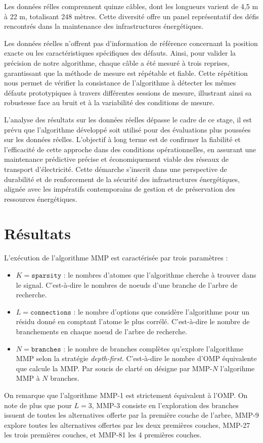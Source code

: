 \documentclass[9pt,a4paper,twoside]{rho}
\begin{document}
Les données rélles comprennent quinze câbles, dont les longueurs varient de 4,5 m à 22 m, totalisant 248 mètres. Cette diversité offre un panel représentatif des défis rencontrés dans la maintenance des infrastructures énergétiques.

Les données réelles n'offrent pas d'information de référence concernant la position exacte ou les caractéristiques spécifiques des défauts. Ainsi, pour valider la précision de notre algorithme, chaque câble a été mesuré à trois reprises, garantissant que la méthode de mesure est répétable et fiable. Cette répétition nous permet de vérifier la consistance de l'algorithme à détecter les mêmes défauts prototypiques à travers différentes sessions de mesure, illustrant ainsi sa robustesse face au bruit et à la variabilité des conditions de mesure.

L'analyse des résultats sur les données réelles dépasse le cadre de ce stage, il est prévu que l'algorithme développé soit utilisé pour des évaluations plus poussées sur les données réelles. L'objectif à long terme est de confirmer la fiabilité et l'efficacité de cette approche dans des conditions opérationnelles, en assurant une maintenance prédictive précise et économiquement viable des réseaux de transport d'électricité. Cette démarche s'inscrit dans une perspective de durabilité et de renforcement de la sécurité des infrastructures énergétiques, alignée avec les impératifs contemporains de gestion et de préservation des ressources énergétiques.

\newpage
\section{Résultats}

\begin{rhoenv}[frametitle=Considérations pratiques]
    L'exécution de l'algorithme MMP est caractérisée par trois paramètres :
    \begin{itemize}
        \item $K = \texttt{sparsity}$ : le nombres d'atomes que l'algorithme cherche à trouver dans le signal. C'est-à-dire le nombres de noeuds d'une branche de l'arbre de recherche.
        \item $L = \texttt{connections}$ : le nombre d'options que considère l'algorithme pour un résidu donné en comptant l'atome le plus corrélé. C'est-à-dire le nombre de branchements en chaque noeud de l'arbre de recherche.
        \item $N = \texttt{branches}$ : le nombre de branches complètes qu'explore l'algorithme MMP selon la stratégie \textit{depth-first}. C'est-à-dire le nombre d'OMP équivalente que calcule la MMP. Par soucis de clarté on désigne par MMP-$N$ l'algorihme MMP à $N$ branches.
    \end{itemize}
    On remarque que l'algorithme MMP-1 est strictement équivalent à l'OMP. On note de plus que pour $L=3$, MMP-3 consiste en l'exploration des branches issuent de toutes les alternatives offerte par la première couche de l'arbre, MMP-9 explore toutes les alternatives offertes par les deux premières couches, MMP-27 les trois premières couches, et MMP-81 les 4 premières couches.
\end{rhoenv}
\end{document}
